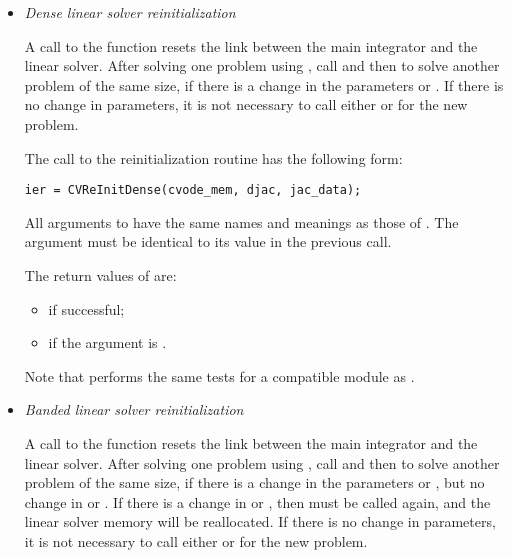 \begin{itemize}

\item {\em Dense linear solver reinitialization} 

  A call to the  function resets the link between   
  the main {\cvode} integrator and the {\cvdense} linear solver.       
  After solving one problem using {\cvdense}, call  and then
   to solve another problem of the same size, if    
  there is a change in the  parameters  or .  
  If there is no change in parameters, it is not necessary to    
  call either  or  for the new problem.  

  The call to the {\cvdense} reinitialization routine has the following form:
\begin{verbatim}
ier = CVReInitDense(cvode_mem, djac, jac_data);
\end{verbatim}
  All arguments to  have the same names and meanings
  as those of .  The  argument must be identical 
  to its value in the previous  call.                     
  
  The return values of  are:
  \begin{itemize}
  \item {} if successful;
  \item {} if the  argument is .
  \end{itemize}         
  
  Note that  performs the same tests for a compatible {\nvector} 
  module as .
  
\item {\em Banded linear solver reinitialization}
  
  A call to the  function resets the link between    
  the main {\cvode} integrator and the {\cvband} linear solver.        
  After solving one problem using {\cvband}, call  and then 
   to solve another problem of the same size, if     
  there is a change in the  parameters  or ,   
  but no change in  or .  If there is a change in    
   or , then  must be called again, and the    
  linear solver memory will be reallocated.                      
  If there is no change in parameters, it is not necessary to    
  call either  or  for the new problem.


\end{itemize}
